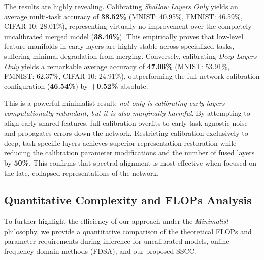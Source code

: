\documentclass{article}
\theoremstyle{plain}
\theoremstyle{definition}
\theoremstyle{remark}
\begin{document}
The results are highly revealing. Calibrating \textit{Shallow Layers Only} yields an average multi-task accuracy of \textbf{38.52\%} (MNIST: 40.95\%, FMNIST: 46.59\%, CIFAR-10: 28.01\%), representing virtually no improvement over the completely uncalibrated merged model (\textbf{38.46\%}). This empirically proves that low-level feature manifolds in early layers are highly stable across specialized tasks, suffering minimal degradation from merging. Conversely, calibrating \textit{Deep Layers Only} yields a remarkable average accuracy of \textbf{47.06\%} (MNIST: 53.91\%, FMNIST: 62.37\%, CIFAR-10: 24.91\%), outperforming the full-network calibration configuration (\textbf{46.54\%}) by \textbf{+0.52\%} absolute. 

This is a powerful minimalist result: \textit{not only is calibrating early layers computationally redundant, but it is also marginally harmful}. By attempting to align early shared features, full calibration overfits to early task-agnostic noise and propagates errors down the network. Restricting calibration exclusively to deep, task-specific layers achieves superior representation restoration while reducing the calibration parameter modifications and the number of fused layers by \textbf{50\%}. This confirms that spectral alignment is most effective when focused on the late, collapsed representations of the network.

\subsection{Quantitative Complexity and FLOPs Analysis}
To further highlight the efficiency of our approach under the \textit{Minimalist} philosophy, we provide a quantitative comparison of the theoretical FLOPs and parameter requirements during inference for uncalibrated models, online frequency-domain methods (FDSA), and our proposed SSCC.
\end{document}
